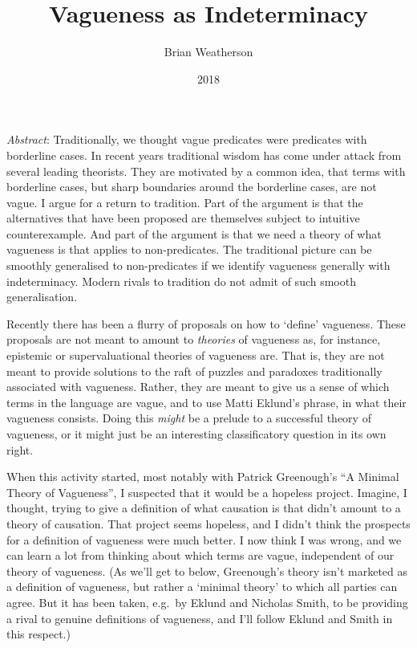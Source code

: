 \documentclass[
  11pt,
  letterpaper,
  DIV=11,
  numbers=noendperiod,
  twoside]{scrartcl}
\title{Vagueness as Indeterminacy}
\author{Brian Weatherson}
\date{2018}
\renewenvironment{abstract}
 {\vspace{-1.25cm}
 \quotation\small\noindent\emph{Abstract}:}
 {\endquotation}
\begin{document}
\maketitle
\begin{abstract}
Traditionally, we thought vague predicates were predicates with
borderline cases. In recent years traditional wisdom has come under
attack from several leading theorists. They are motivated by a common
idea, that terms with borderline cases, but sharp boundaries around the
borderline cases, are not vague. I argue for a return to tradition. Part
of the argument is that the alternatives that have been proposed are
themselves subject to intuitive counterexample. And part of the argument
is that we need a theory of what vagueness is that applies to
non-predicates. The traditional picture can be smoothly generalised to
non-predicates if we identify vagueness generally with indeterminacy.
Modern rivals to tradition do not admit of such smooth generalisation.
\end{abstract}


Recently there has been a flurry of proposals on how to `define'
vagueness. These proposals are not meant to amount to \emph{theories} of
vagueness as, for instance, epistemic or supervaluational theories of
vagueness are. That is, they are not meant to provide solutions to the
raft of puzzles and paradoxes traditionally associated with vagueness.
Rather, they are meant to give us a sense of which terms in the language
are vague, and to use Matti Eklund's phrase, in what their vagueness
consists. Doing this \emph{might} be a prelude to a successful theory of
vagueness, or it might just be an interesting classificatory question in
its own right.

When this activity started, most notably with Patrick Greenough's ``A
Minimal Theory of Vagueness'', I suspected that it would be a hopeless
project. Imagine, I thought, trying to give a definition of what
causation is that didn't amount to a theory of causation. That project
seems hopeless, and I didn't think the prospects for a definition of
vagueness were much better. I now think I was wrong, and we can learn a
lot from thinking about which terms are vague, independent of our theory
of vagueness. (As we'll get to below, Greenough's theory isn't marketed
as a definition of vagueness, but rather a `minimal theory' to which all
parties can agree. But it has been taken, e.g.~by Eklund and Nicholas
Smith, to be providing a rival to genuine definitions of vagueness, and
I'll follow Eklund and Smith in this respect.)
\end{document}
